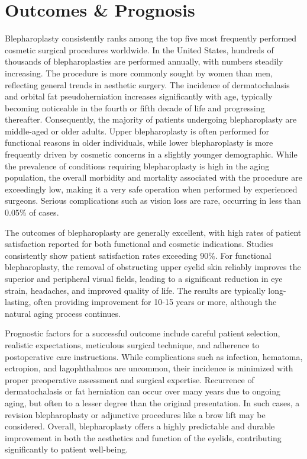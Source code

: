 \section*{Outcomes \& Prognosis}
Blepharoplasty consistently ranks among the top five most frequently performed cosmetic surgical procedures worldwide. In the United States, hundreds of thousands of blepharoplasties are performed annually, with numbers steadily increasing. The procedure is more commonly sought by women than men, reflecting general trends in aesthetic surgery. The incidence of dermatochalasis and orbital fat pseudoherniation increases significantly with age, typically becoming noticeable in the fourth or fifth decade of life and progressing thereafter. Consequently, the majority of patients undergoing blepharoplasty are middle-aged or older adults. Upper blepharoplasty is often performed for functional reasons in older individuals, while lower blepharoplasty is more frequently driven by cosmetic concerns in a slightly younger demographic. While the prevalence of conditions requiring blepharoplasty is high in the aging population, the overall morbidity and mortality associated with the procedure are exceedingly low, making it a very safe operation when performed by experienced surgeons. Serious complications such as vision loss are rare, occurring in less than 0.05\% of cases.

The outcomes of blepharoplasty are generally excellent, with high rates of patient satisfaction reported for both functional and cosmetic indications. Studies consistently show patient satisfaction rates exceeding 90\%. For functional blepharoplasty, the removal of obstructing upper eyelid skin reliably improves the superior and peripheral visual fields, leading to a significant reduction in eye strain, headaches, and improved quality of life. The results are typically long-lasting, often providing improvement for 10-15 years or more, although the natural aging process continues.

Prognostic factors for a successful outcome include careful patient selection, realistic expectations, meticulous surgical technique, and adherence to postoperative care instructions. While complications such as infection, hematoma, ectropion, and lagophthalmos are uncommon, their incidence is minimized with proper preoperative assessment and surgical expertise. Recurrence of dermatochalasis or fat herniation can occur over many years due to ongoing aging, but often to a lesser degree than the original presentation. In such cases, a revision blepharoplasty or adjunctive procedures like a brow lift may be considered. Overall, blepharoplasty offers a highly predictable and durable improvement in both the aesthetics and function of the eyelids, contributing significantly to patient well-being.

